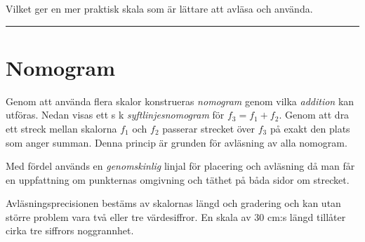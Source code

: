 \documentclass[oneside,11pt,a4paper,swedish]{scrbook}
\newcommand{\slutex}{\begin{flushright} \rule{1ex}{1ex} \end{flushright}}
\begin{document}
Vilket ger en mer praktisk skala som är lättare att avläsa och använda. 

\slutex

\chapter{Nomogram}

Genom att använda flera skalor konstrueras \emph{nomogram} genom vilka  \emph{addition} kan utföras. Nedan visas ett s k \emph{syftlinjesnomogram} för $f_3=f_1+f_2$. Genom att dra ett streck mellan skalorna $f_1$ och $f_2$ passerar strecket över $f_3$ på exakt den plats som anger summan. Denna princip är grunden för avläsning av alla nomogram. 

Med fördel används en \emph{genomskinlig} linjal för placering och avläsning då man får en uppfattning om punkternas omgivning och täthet på båda sidor om strecket. 

Avläsningsprecisionen bestäms av skalornas längd och gradering och kan utan större problem vara två eller tre värdesiffror. En skala av 30 cm:s längd tillåter cirka tre siffrors noggrannhet.

\end{document}
